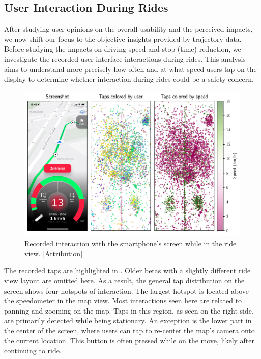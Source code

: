 \subsection{User Interaction During Rides}

After studying user opinions on the overall usability and the perceived impacts, we now shift our focus to the objective insights provided by trajectory data. Before studying the impacts on driving speed and stop (time) reduction, we investigate the recorded user interface interactions during rides. This analysis aims to understand more precisely how often and at what speed users tap on the display to determine whether interaction during rides could be a safety concern.

\begin{figure}[t]
\caption{Recorded interaction with the smartphone's screen while in the ride view. [\hyperref[attribution]{Attribution}]}\label{fig:app-user-interaction}
\includegraphics[width=\linewidth]{images/app-user-interaction.pdf}
\end{figure}

The recorded taps are highlighted in . Older betas with a slightly different ride view layout are omitted here. As a result, the general tap distribution on the screen shows four hotspots of interaction. The largest hotspot is located above the speedometer in the map view. Most interactions seen here are related to panning and zooming on the map. Taps in this region, as seen on the right side, are primarily detected while being stationary. An exception is the lower part in the center of the screen, where users can tap to re-center the map's camera onto the current location. This button is often pressed while on the move, likely after continuing to ride.

